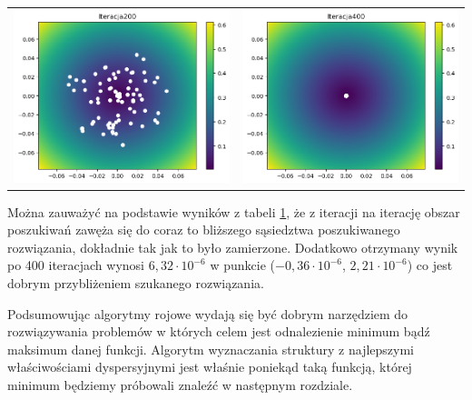 \begin{table}[H]
\begin{tabular}{cc}
         \includegraphics[width=0.5\linewidth]{figures/3d/it200.png} &
         \includegraphics[width=0.5\linewidth]{figures/3d/it400.png}
    \end{tabular}
    \label{tab:wyniki3d}
\end{table}

Można zauważyć na podstawie wyników z tabeli \ref{tab:wyniki3d}, że z iteracji na iterację obszar poszukiwań zawęża się do coraz to bliższego sąsiedztwa poszukiwanego rozwiązania, dokładnie tak jak to było zamierzone. Dodatkowo otrzymany wynik po 400 iteracjach wynosi $6,32\cdot10^{-6}$ w punkcie ($-0,36\cdot10^{-6}$, $2,21\cdot10^{-6}$) co jest dobrym przybliżeniem szukanego rozwiązania.

Podsumowując algorytmy rojowe wydają się być dobrym narzędziem do rozwiązywania problemów w których celem jest odnalezienie minimum bądź maksimum danej funkcji. Algorytm wyznaczania struktury z najlepszymi właściwościami dyspersyjnymi jest właśnie poniekąd taką funkcją, której minimum będziemy próbowali znaleźć w następnym rozdziale.